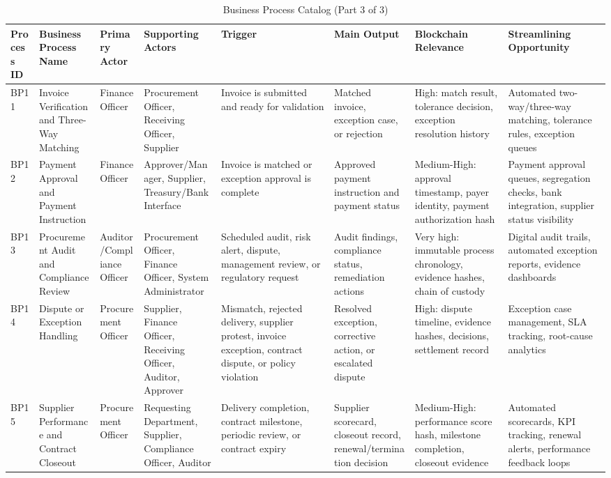 \documentclass[conference]{IEEEtran}
\begin{document}
\begin{table}[!t]
\caption{Business Process Catalog (Part 3 of 3)}
\label{tab:catalog-3}
\tiny
\begin{tabularx}{\textwidth}{|L{0.85cm}|L{2.3cm}|L{2.1cm}|L{2.6cm}|Y|L{2.0cm}|Y|Y|}
\hline
\textbf{Process ID} & \textbf{Business Process Name} & \textbf{Primary Actor} & \textbf{Supporting Actors} & \textbf{Trigger} & \textbf{Main Output} & \textbf{Blockchain Relevance} & \textbf{Streamlining Opportunity} \\ \hline
BP11 & Invoice Verification and Three-Way Matching & Finance Officer & Procurement Officer, Receiving Officer, Supplier & Invoice is submitted and ready for validation & Matched invoice, exception case, or rejection & High: match result, tolerance decision, exception resolution history & Automated two-way/three-way matching, tolerance rules, exception queues \\ \hline
BP12 & Payment Approval and Payment Instruction & Finance Officer & Approver/Manager, Supplier, Treasury/Bank Interface & Invoice is matched or exception approval is complete & Approved payment instruction and payment status & Medium-High: approval timestamp, payer identity, payment authorization hash & Payment approval queues, segregation checks, bank integration, supplier status visibility \\ \hline
BP13 & Procurement Audit and Compliance Review & Auditor/Compliance Officer & Procurement Officer, Finance Officer, System Administrator & Scheduled audit, risk alert, dispute, management review, or regulatory request & Audit findings, compliance status, remediation actions & Very high: immutable process chronology, evidence hashes, chain of custody & Digital audit trails, automated exception reports, evidence dashboards \\ \hline
BP14 & Dispute or Exception Handling & Procurement Officer & Supplier, Finance Officer, Receiving Officer, Auditor, Approver & Mismatch, rejected delivery, supplier protest, invoice exception, contract dispute, or policy violation & Resolved exception, corrective action, or escalated dispute & High: dispute timeline, evidence hashes, decisions, settlement record & Exception case management, SLA tracking, root-cause analytics \\ \hline
BP15 & Supplier Performance and Contract Closeout & Procurement Officer & Requesting Department, Supplier, Compliance Officer, Auditor & Delivery completion, contract milestone, periodic review, or contract expiry & Supplier scorecard, closeout record, renewal/termination decision & Medium-High: performance score hash, milestone completion, closeout evidence & Automated scorecards, KPI tracking, renewal alerts, performance feedback loops \\ \hline
\end{tabularx}
\end{table}
\end{document}
